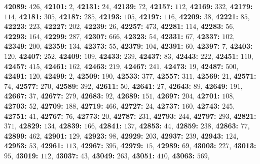 \textsf{\bfseries 42089:} $426$, \textsf{\bfseries 42101:} $2$, \textsf{\bfseries 42131:} $24$, \textsf{\bfseries 42139:} $72$, \textsf{\bfseries 42157:} $112$, \textsf{\bfseries 42169:} $332$, \textsf{\bfseries 42179:} $114$, \textsf{\bfseries 42181:} $305$, \textsf{\bfseries 42187:} $285$, \textsf{\bfseries 42193:} $105$, \textsf{\bfseries 42197:} $116$, \textsf{\bfseries 42209:} $38$, \textsf{\bfseries 42221:} $85$, \textsf{\bfseries 42223:} $223$, \textsf{\bfseries 42227:} $202$, \textsf{\bfseries 42239:} $26$, \textsf{\bfseries 42257:} $473$, \textsf{\bfseries 42281:} $114$, \textsf{\bfseries 42283:} $56$, \textsf{\bfseries 42293:} $164$, \textsf{\bfseries 42299:} $287$, \textsf{\bfseries 42307:} $666$, \textsf{\bfseries 42323:} $54$, \textsf{\bfseries 42331:} $67$, \textsf{\bfseries 42337:} $102$, \textsf{\bfseries 42349:} $200$, \textsf{\bfseries 42359:} $134$, \textsf{\bfseries 42373:} $55$, \textsf{\bfseries 42379:} $104$, \textsf{\bfseries 42391:} $60$, \textsf{\bfseries 42397:} $7$, \textsf{\bfseries 42403:} $120$, \textsf{\bfseries 42407:} $252$, \textsf{\bfseries 42409:} $109$, \textsf{\bfseries 42433:} $239$, \textsf{\bfseries 42437:} $83$, \textsf{\bfseries 42443:} $222$, \textsf{\bfseries 42451:} $110$, \textsf{\bfseries 42457:} $415$, \textsf{\bfseries 42461:} $162$, \textsf{\bfseries 42463:} $219$, \textsf{\bfseries 42467:} $241$, \textsf{\bfseries 42473:} $19$, \textsf{\bfseries 42487:} $500$, \textsf{\bfseries 42491:} $120$, \textsf{\bfseries 42499:} $2$, \textsf{\bfseries 42509:} $190$, \textsf{\bfseries 42533:} $377$, \textsf{\bfseries 42557:} $311$, \textsf{\bfseries 42569:} $21$, \textsf{\bfseries 42571:} $74$, \textsf{\bfseries 42577:} $270$, \textsf{\bfseries 42589:} $392$, \textsf{\bfseries 42611:} $50$, \textsf{\bfseries 42641:} $27$, \textsf{\bfseries 42643:} $89$, \textsf{\bfseries 42649:} $191$, \textsf{\bfseries 42667:} $37$, \textsf{\bfseries 42677:} $279$, \textsf{\bfseries 42683:} $92$, \textsf{\bfseries 42689:} $151$, \textsf{\bfseries 42697:} $204$, \textsf{\bfseries 42701:} $108$, \textsf{\bfseries 42703:} $52$, \textsf{\bfseries 42709:} $188$, \textsf{\bfseries 42719:} $466$, \textsf{\bfseries 42727:} $24$, \textsf{\bfseries 42737:} $160$, \textsf{\bfseries 42743:} $245$, \textsf{\bfseries 42751:} $41$, \textsf{\bfseries 42767:} $76$, \textsf{\bfseries 42773:} $20$, \textsf{\bfseries 42787:} $231$, \textsf{\bfseries 42793:} $244$, \textsf{\bfseries 42797:} $293$, \textsf{\bfseries 42821:} $371$, \textsf{\bfseries 42829:} $134$, \textsf{\bfseries 42839:} $166$, \textsf{\bfseries 42841:} $137$, \textsf{\bfseries 42853:} $44$, \textsf{\bfseries 42859:} $238$, \textsf{\bfseries 42863:} $77$, \textsf{\bfseries 42899:} $462$, \textsf{\bfseries 42901:} $129$, \textsf{\bfseries 42923:} $98$, \textsf{\bfseries 42929:} $203$, \textsf{\bfseries 42937:} $239$, \textsf{\bfseries 42943:} $124$, \textsf{\bfseries 42953:} $53$, \textsf{\bfseries 42961:} $113$, \textsf{\bfseries 42967:} $395$, \textsf{\bfseries 42979:} $15$, \textsf{\bfseries 42989:} $69$, \textsf{\bfseries 43003:} $227$, \textsf{\bfseries 43013:} $95$, \textsf{\bfseries 43019:} $112$, \textsf{\bfseries 43037:} $43$, \textsf{\bfseries 43049:} $263$, \textsf{\bfseries 43051:} $410$, \textsf{\bfseries 43063:} $569$, 
